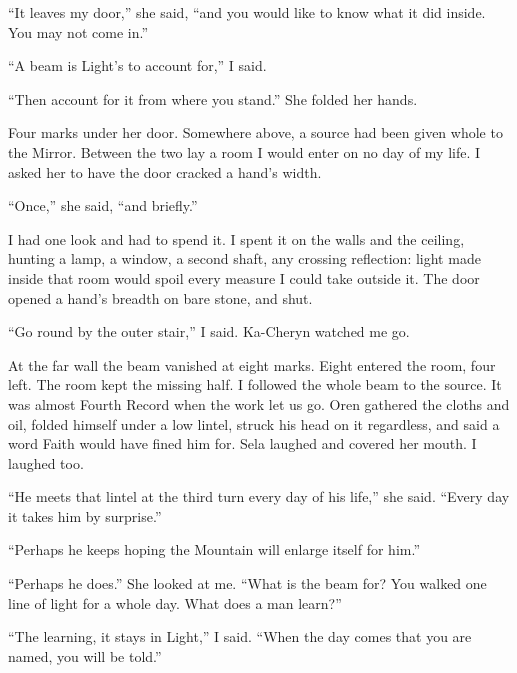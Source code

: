 ``It leaves my door,'' she said, ``and you would like to know what it did inside. You may not come in.''\par

``A beam is Light's to account for,'' I said. \par

``Then account for it from where you stand.'' She folded her hands. \par

Four marks under her door. Somewhere above, a source had been given whole to the Mirror. Between the two lay a room I would enter on no day of my life. I asked her to have the door cracked a hand's width. \par

``Once,'' she said, ``and briefly.''\par

I had one look and had to spend it. I spent it on the walls and the ceiling, hunting a lamp, a window, a second shaft, any crossing reflection: light made inside that room would spoil every measure I could take outside it. The door opened a hand's breadth on bare stone, and shut.\par

``Go round by the outer stair,'' I said. Ka-Cheryn watched me go.\par

At the far wall the beam vanished at eight marks. Eight entered the room, four left. The room kept the missing half. I followed the whole beam to the source. It was almost Fourth Record when the work let us go. Oren gathered the cloths and oil, folded himself under a low lintel, struck his head on it regardless, and said a word Faith would have fined him for. Sela laughed and covered her mouth. I laughed too.\par

``He meets that lintel at the third turn every day of his life,'' she said. ``Every day it takes him by surprise.''\par

``Perhaps he keeps hoping the Mountain will enlarge itself for him.''\par

``Perhaps he does.'' She looked at me. ``What is the beam for? You walked one line of light for a whole day. What does a man learn?''\par

``The learning, it stays in Light,'' I said. ``When the day comes that you are named, you will be told.''\par

